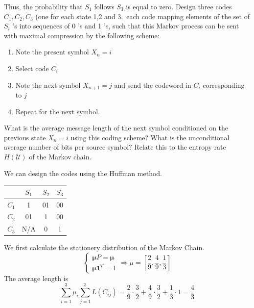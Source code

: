 \begin{exercise}
{  Thus, the probability that $S_{1}$ follows $S_{3}$ is equal to zero. Design three codes $C_{1}, C_{2}, C_{3}$ (one for each state 1,2 and $3,$ each code mapping elements of the set of $S_{i}$ 's into sequences of 0 's and 1 's, such that this Markov process can be sent with maximal compression by the following scheme: 
  \begin{enumerate}
    \item Note the present symbol $X_{n}=i$
    \item Select code $C_{i}$
    \item Note the next symbol $X_{n+1}=j$ and send the codeword in $C_{i}$ corresponding to $j$
    \item Repeat for the next symbol. 
  \end{enumerate}
  What is the average message length of the next symbol conditioned on the previous state $X_{n}=i$ using this coding scheme? What is the unconditional average number of bits per source symbol? Relate this to the entropy rate $H(\mathcal{U})$ of the Markov chain.
  }
  \begin{solution} We can design the codes using the Huffman method.
    \begin{table}[H]
      \begin{center}
        \begin{tabular}{c|ccc}
          & $S_1$         & $S_2$         & $S_3$         \\ \hline
        $C_1$                                         & 1 & 01 & 00 \\
        $C_2$                                         & 01 & 1 & 00 \\
        $C_3$                                         & N/A             & 0 & 1
        \end{tabular}
      \end{center}
    \end{table}
    We first calculate the stationery distribution of the Markov Chain.
    \begin{equation}
      \left\{\begin{array}{c}
        \mathbf{\mu}P = \mathbf{\mu} \\
        \mathbf{\mu} \mathbf{1}^T = 1
      \end{array}\right. \Rightarrow \mu = \left[\frac{2}{9}, \frac{4}{9},\frac{1}{3}\right]
    \end{equation}
    The average length is
    \begin{equation}
      \sum_{i=1}^{3} \mu_{i} \sum_{j=1}^{3} L(C_{ij}) = \frac{2}{9}\cdot\frac{3}{2} + \frac{4}{9} \cdot\frac{3}{2}+\frac{1}{3}\cdot 1 = \frac{4}{3}

\end{equation}
\end{solution}
\end{exercise}
